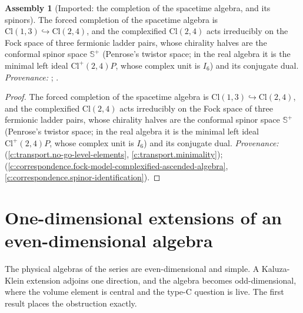 \documentclass[11pt]{article}
\theoremstyle{definition}
\newtheorem{assembled}[theorem]{Assembly}
\theoremstyle{plain}
\providecommand{\CS}{}\renewcommand{\CS}{{\mathbb{S}^{+}}}
\providecommand{\Cl}{}\renewcommand{\Cl}{\mathrm{Cl}}
\begin{document}
\begin{assembled}[Imported: the completion of the spacetime algebra, and its spinors]\label{c:rule2.imported-completion-spacetime-algebra-spinors}
The forced completion of the spacetime algebra is $\Cl(1,3) \hookrightarrow \Cl(2,4)$, and the complexified $\Cl(2,4)$ acts irreducibly on the Fock space of three fermionic ladder pairs, whose chirality halves are the conformal spinor space $\CS$ (Penrose's twistor space; in the real algebra it is the minimal left ideal $\Cl^+(2,4)P$, whose complex unit is $I_6$) and its conjugate dual. \emph{Provenance:} \cite[Thms.~4.2 and 4.13]{ButlerT1}; \cite[Thms.~3.1 and 3.4]{ButlerT9}.
\end{assembled}
\begin{proof}
The forced completion of the spacetime algebra is $\Cl(1,3) \hookrightarrow \Cl(2,4)$, and the complexified $\Cl(2,4)$ acts irreducibly on the Fock space of three fermionic ladder pairs, whose chirality halves are the conformal spinor space $\CS$ (Penrose's twistor space; in the real algebra it is the minimal left ideal $\Cl^+(2,4)P$, whose complex unit is $I_6$) and its conjugate dual. \emph{Provenance:} \cite[Thms.~4.2 and 4.13]{ButlerT1} (\ref{c:transport.no-go-level-elements}, \ref{c:transport.minimality}); \cite[Thms.~3.1 and 3.4]{ButlerT9} (\ref{c:correspondence.fock-model-complexified-ascended-algebra}, \ref{c:correspondence.spinor-identification}).

\end{proof}

\section{One-dimensional extensions of an even-dimensional algebra}

\label{c:note.rule2.setting-one-dimensional-extensions-even-dimensional}
The physical algebras of the series are even-dimensional and simple. A Kaluza-Klein extension adjoins one direction, and the algebra becomes odd-dimensional, where the volume element is central and the type-C question is live. The first result places the obstruction exactly.
\end{document}
